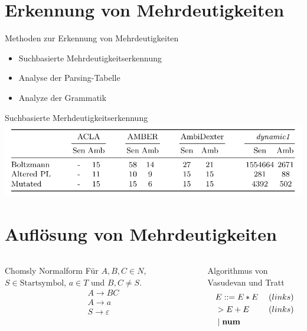 \documentclass[t]{beamer}
\renewcommand{\Coloneqq}{\mathrel{\mathop{::}}=}
\begin{document}
	\section{Erkennung von Mehrdeutigkeiten}\label{sec:erkennung-von-mehrdeutigkeiten}
	\begin{frame}
		\begin{block}{Methoden zur Erkennung von Mehrdeutigkeiten}
			\begin{itemize}
				\item Suchbasierte Mehrdeutigkeitserkennung
				\item Analyse der Parsing-Tabelle
				\item Analyze der Grammatik
			\end{itemize}
		\end{block}
		\begin{exampleblock}{Suchbasierte Merhdeutigkeitserkennung}
			\includegraphics[width=\textwidth]{./img}\cite{springer2013}
		\end{exampleblock}
	\end{frame}


	\section{Auflösung von Mehrdeutigkeiten}\label{sec:auflsung-von-mehrdeutigkeiten}
	\begin{frame}
		\begin{columns}[T]
			\column{0.45\textwidth}
			\begin{block}{Chomsly Normalform}
				Für $A,B,C \in N$, $S \in \text{Startsymbol}$, $a \in T$ und $B,C \neq S$. \\
				\begin{align*}
					& A \rightarrow BC \\
					& A \rightarrow a \\
					& S \rightarrow \varepsilon
				\end{align*}
			\end{block}
			\column{0.45\textwidth}
			\begin{block}{Algorithmus von Vasudevan und Tratt}
				\begin{align*}
					& E \Coloneqq E * E \phantom{|} & (links) \\
					& > E + E & (links) \\
					& \phantom{|} | \phantom{|} \bold{num}
				\end{align*}
			\end{block}
		\end{columns}
	\end{frame}
\end{document}
